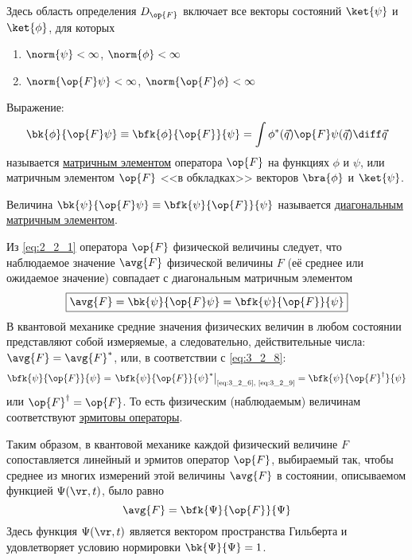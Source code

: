 Здесь область определения $D_{\op{F}}$ включает все векторы состояний $\ket{\psi}$ и $\ket{\phi}$, для которых
\begin{enumerate}
\item $\norm{\psi} < \infty$, $\norm{\phi} < \infty$
\item $\norm{\op{F} \psi} < \infty$, $\norm{\op{F} \phi} < \infty$
\end{enumerate}


\begin{defn}
Выражение:
$$
\bk{\phi}{\op{F}\psi} \equiv
  \bfk{\phi}{\op{F}}{\psi} =
  \int \phi^*(\vec{q})\op{F}\psi(\vec{q})\diff\vec{q}
$$
называется \underline{матричным элементом} оператора $\op{F}$ на функциях $\phi$ и $\psi$, или матричным элементом $\op{F}$ <<в обкладках>> векторов $\bra{\phi}$ и $\ket{\psi}$.

Величина $\bk{\psi}{\op{F}\psi} \equiv \bfk{\psi}{\op{F}}{\psi}$ называется \underline{диагональным матричным элементом}.
\end{defn}

Из \eqref{eq:2_2_1} оператора $\op{F}$ физической величины следует, что наблюдаемое значение $\avg{F}$ физической величины $F$ (её среднее или ожидаемое значение) совпадает с диагональным матричным элементом
\begin{equation}
\label{eq:3_2_8}
\boxed {
	\avg{F} = \bk{\psi}{\op{F}\psi} = \bfk{\psi}{\op{F}}{\psi}
}
\end{equation}%
%
В квантовой механике средние значения физических величин в любом состоянии представляют собой измеряемые, а следовательно, действительные числа: $\avg{F} = \avg{F}^*$, или, в соответствии с \eqref{eq:3_2_8}:
\begin{equation}
\label{eq:3_2_9}
\bfk{\psi}{\op{F}}{\psi}
  = \left .\bfk{\psi}{\op{F}}{\psi}^* \right|_{\text{\eqref{eq:3_2_6}, \eqref{eq:3_2_9}}}
  = \bfk{\psi}{\op{F}^\dag}{\psi}
\end{equation}%
%
или $\op{F}^\dag = \op{F}$. То есть физическим (наблюдаемым) величинам соответствуют \underline{эрмитовы операторы}.

Таким образом, в квантовой механике каждой физический величине $F$ сопоставляется линейный и эрмитов оператор $\op{F}$, выбираемый так, чтобы среднее из многих измерений этой величины $\avg{F}$ в состоянии, описываемом функцией $\Psi(\vr, t)$, было равно
$$
\avg{F} = \bfk{\Psi}{\op{F}}{\Psi}
$$
Здесь функция $\Psi(\vr, t)$ является вектором пространства Гильберта и удовлетворяет условию нормировки $\bk{\Psi}{\Psi} = 1$.

